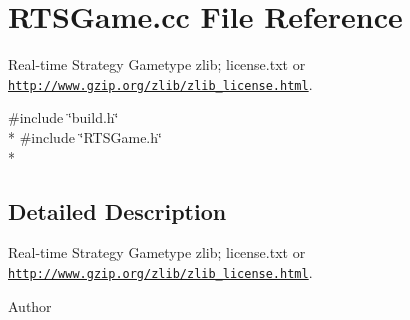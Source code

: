 \section{R\-T\-S\-Game.\-cc File Reference}
\label{_r_t_s_game_8cc}


Real-\/time Strategy Gametype  zlib; license.\-txt or \href{http://www.gzip.org/zlib/zlib_license.html}{\tt http\-://www.\-gzip.\-org/zlib/zlib\-\_\-license.\-html}.  


{\ttfamily \#include \char`\"{}build.\-h\char`\"{}}\\*
{\ttfamily \#include \char`\"{}R\-T\-S\-Game.\-h\char`\"{}}\\*


\subsection{Detailed Description}
Real-\/time Strategy Gametype  zlib; license.\-txt or \href{http://www.gzip.org/zlib/zlib_license.html}{\tt http\-://www.\-gzip.\-org/zlib/zlib\-\_\-license.\-html}. \begin{DoxyAuthor}{Author}

\end{DoxyAuthor}
